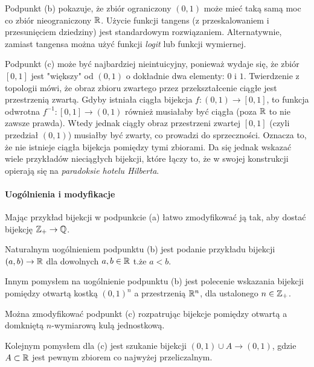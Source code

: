 Podpunkt (b) pokazuje, że zbiór ograniczony $(0,1)$ może mieć taką samą moc
co zbiór nieograniczony $\mathbb{R}$. Użycie funkcji tangens (z przeskalowaniem
i przesunięciem dziedziny) jest standardowym rozwiązaniem.
Alternatywnie, zamiast tangensa można użyć funkcji \textit{logit} lub
funkcji wymiernej.

Podpunkt (c) może być najbardziej nieintuicyjny, ponieważ wydaje
się, że zbiór $[0,1]$ jest "większy" od $(0,1)$ o dokładnie dwa
elementy: $0$ i $1$. Twierdzenie z topologii mówi, że obraz zbioru zwartego
przez przekształcenie ciągłe jest przestrzenią zwartą. Gdyby istniała
ciągła bijekcja $f: (0,1) \to [0,1]$, to funkcja odwrotna
$f^{-1}: [0,1] \to (0,1)$ również musiałaby być ciągła (poza $\mathbb{R}$ to nie zawsze prawda).
Wtedy jednak ciągły obraz przestrzeni zwartej $[0,1]$ (czyli przedział $(0,1)$) musiałby być
zwarty, co prowadzi do sprzeczności. Oznacza to, że nie istnieje ciągła
bijekcja pomiędzy tymi zbiorami. Da się jednak wskazać wiele przykładów
nieciągłych bijekcji, które łączy to, że w swojej konstrukcji opierają się na
\textit{paradoksie hotelu Hilberta}.


\paragraph{Uogólnienia i modyfikacje} %

Mając przykład bijekcji w podpunkcie (a) łatwo zmodyfikować ją tak,
aby dostać bijekcję $\mathbb{Z}_+\to\mathbb{Q}$. 

Naturalnym uogólnieniem podpunktu (b) jest podanie przykładu bijekcji
$(a, b) \to \mathbb{R}$ dla dowolnych $a, b \in \mathbb{R}$ t.że $a < b$.

Innym pomysłem na uogólnienie podpunktu (b) jest polecenie wskazania bijekcji
pomiędzy otwartą kostką $(0, 1)^n$ a przestrzenią $\mathbb{R}^n$, dla ustalonego
$n \in \mathbb{Z}_+$.

Można zmodyfikować podpunkt (c) rozpatrując bijekcje pomiędzy otwartą a 
domkniętą $n$-wymiarową kulą jednostkową.

Kolejnym pomysłem dla (c) jest szukanie bijekcji $(0, 1) \cup A \to (0, 1)$,
gdzie $A \subset \mathbb{R}$ jest pewnym zbiorem co najwyżej przeliczalnym.
